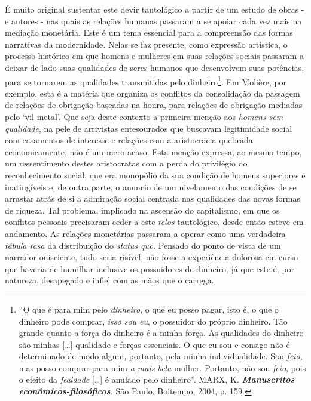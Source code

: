 É muito original sustentar este devir tautológico a partir de um estudo
de obras - e autores - nas quais as relações humanas passaram a se
apoiar cada vez mais na mediação monetária. Este é um tema essencial
para a compreensão das formas narrativas da modernidade. Nelas se faz
presente, como expressão artística, o processo histórico em que homens e
mulheres em suas relações sociais passaram a deixar de lado suas
qualidades de seres humanos que desenvolvem suas potências, para se
tornarem as qualidades transmitidas pelo dinheiro\footnote{``O que é
  para mim pelo \emph{dinheiro}, o que eu posso pagar, isto é, o que o
  dinheiro pode comprar, \emph{isso sou eu}, o possuidor do próprio
  dinheiro. Tão grande quanto a força do dinheiro é a minha força. As
  qualidades do dinheiro são minhas {[}\ldots{}{]} qualidade e forças
  essenciais. O que eu sou e consigo não é determinado de modo algum,
  portanto, pela minha individualidade. Sou \emph{feio}, mas posso
  comprar para mim \emph{a mais bela} mulher. Portanto, não sou
  \emph{feio}, pois o efeito da \emph{fealdade} {[}\ldots{}{]} é anulado
  pelo dinheiro''. MARX, K. \emph{\textbf{Manuscritos
  econômicos-filosóficos}.} São Paulo, Boitempo, 2004, p. 159.}. Em
Molière, por exemplo, esta é a matéria que organiza os conflitos da
consolidação da passagem de relações de obrigação baseadas na honra,
para relações de obrigação mediadas pelo `vil metal'. Que seja deste
contexto a primeira menção aos \emph{homens sem qualidade}, na pele de
arrivistas entesourados que buscavam legitimidade social com casamentos
de interesse e relações com a aristocracia quebrada economicamente, não
é um mero acaso. Esta menção expressa, ao mesmo tempo, um ressentimento
destes aristocratas com a perda do privilégio do reconhecimento social,
que era monopólio da sua condição de homens superiores e inatingíveis e,
de outra parte, o anuncio de um nivelamento das condições de se arrastar
atrás de si a admiração social centrada nas qualidades das novas formas
de riqueza. Tal problema, implicado na ascensão do capitalismo, em que
os conflitos pessoais precisaram ceder a este \emph{telos} tautológico,
desde então esteve em andamento. As relações monetárias passaram a
operar como uma verdadeira \emph{tábula rasa} da distribuição do
\emph{status quo}. Pensado do ponto de vista de um narrador onisciente,
tudo seria risível, não fosse a experiência dolorosa em curso que
haveria de humilhar inclusive os possuidores de dinheiro, já que este é,
por natureza, desapegado e infiel com as mãos que o carrega.

